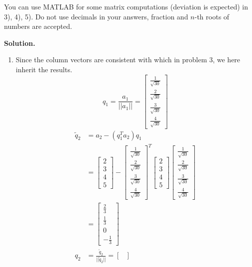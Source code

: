 \documentclass[english,onecolumn]{IEEEtran}
\begin{document}
 You can use MATLAB for some matrix computations (deviation is expected) in 3), 4), 5).
Do not use decimals in your answers, fraction and $n$-th roots of numbers are accepted.

\noindent
\textbf{Solution.}
\begin{enumerate}
	\item Since the column vectors are consistent with which in problem 3, we here inherit the results.
	$$q_1=\frac{a_1}{||a_1||}=
    \begin{bmatrix}
    \frac{1}{\sqrt{30}} \\
    \frac{2}{\sqrt{30}} \\
    \frac{3}{\sqrt{30}}\\
    \frac{4}{\sqrt{30}}
    \end{bmatrix}$$
    \begin{align*}
    	\tilde{q}_2&=a_2-(q_1^Ta_2)q_1\\
    	&=
    \begin{bmatrix}
    2\\
    3\\
    4\\
    5
    \end{bmatrix}-    \begin{bmatrix}
    \frac{1}{\sqrt{30}} \\
    \frac{2}{\sqrt{30}} \\
    \frac{3}{\sqrt{30}}\\
    \frac{4}{\sqrt{30}}
    \end{bmatrix}^T    \begin{bmatrix}
    2\\
    3\\
    4\\
    5
    \end{bmatrix}\begin{bmatrix}
    \frac{1}{\sqrt{30}} \\
    \frac{2}{\sqrt{30}} \\
    \frac{3}{\sqrt{30}}\\
    \frac{4}{\sqrt{30}}
    \end{bmatrix}\\
   	&=\begin{bmatrix}
    \frac{2}{3} \\
    \frac{1}{3} \\
    0\\
    -\frac{1}{3}
    \end{bmatrix}\\
    q_2 &= \frac{\tilde{q}_2}{||\tilde{q}_2||}=\begin{bmatrix}

\end{bmatrix}
\end{align*}
\end{enumerate}
\end{document}
